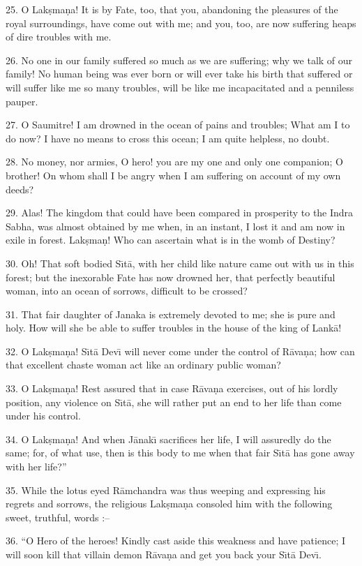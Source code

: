25. O Lak\d{s}ma\d{n}a! It is by Fate, too, that you, abandoning the pleasures of the royal surroundings, have come out with me; and you, too, are now suffering heaps of dire troubles with me.

26. No one in our family suffered so much as we are suffering; why we talk of our family! No human being was ever born or will ever take his birth that suffered or will suffer like me so many troubles, will be like me incapacitated and a penniless pauper.

27. O Saumitre! I am drowned in the ocean of pains and troubles; What am I to do now? I have no means to cross this ocean; I am quite helpless, no doubt.

28. No money, nor armies, O hero! you are my one and only one companion; O brother! On whom shall I be angry when I am suffering on account of my own deeds?

29. Alas! The kingdom that could have been compared in prosperity to the Indra Sabha, was almost obtained by me when, in an instant, I lost it and am now in exile in forest. Lak\d{s}ma\d{n}! Who can ascertain what is in the womb of Destiny?

30. Oh! That soft bodied S\={\i}t\=a, with her child like nature came out with us in this forest; but the inexorable Fate has now drowned her, that perfectly beautiful woman, into an ocean of sorrows, difficult to be crossed?

31. That fair daughter of Janaka is extremely devoted to me; she is pure and holy. How will she be able to suffer troubles in the house of the king of Lank\=a!

32. O Lak\d{s}ma\d{n}a! S\={\i}t\=a Dev\={\i} will never come under the control of R\=ava\d{n}a; how can that excellent chaste woman act like an ordinary public woman?

33. O Lak\d{s}ma\d{n}a! Rest assured that in case R\=ava\d{n}a exercises, out of his lordly position, any violence on S\={\i}t\=a, she will rather put an end to her life than come under his control.

34. O Lak\d{s}ma\d{n}a! And when J\=anak\={\i} sacrifices her life, I will assuredly do the same; for, of what use, then is this body to me when that fair S\={\i}t\=a has gone away with her life?''

35. While the lotus eyed R\=amchandra was thus weeping and expressing his regrets and sorrows, the religious Lak\d{s}ma\d{n}a consoled him with the following sweet, truthful, words :--

36. ``O Hero of the heroes! Kindly cast aside this weakness and have patience; I will soon kill that villain demon R\=ava\d{n}a and get you back your S\={\i}t\=a Dev\={\i}.

